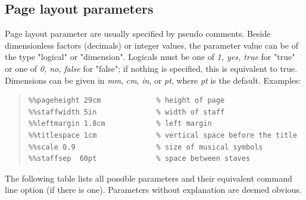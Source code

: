 \documentclass[a4paper]{article}
\begin{document}
\subsection{Page layout parameters}
\label{sec:LayoutParams}
Page layout parameter are usually specified by pseudo comments.
Beside dimensionless factors (decimals) or integer values, the parameter 
value can be of the type "logical" or "dimension". Logicals
must be one of {\it 1, yes, true} for "true" or one of {\it 0, no,
false} for "false"; if nothing is specified, this is equivalent to true.
Dimensions can be given in {\it mm}, {\it cm}, {\it in}, or {\it pt}, 
where {\it pt} is the default.
Examples:
\begin{quote}
\begin{verbatim}
%%pageheight 29cm             % height of page
%%staffwidth 5in              % width of staff
%%leftmargin 1.8cm            % left margin
%%titlespace 1cm              % vertical space before the title
%%scale 0.9                   % size of musical symbols
%%staffsep  60pt              % space between staves
\end{verbatim}
\end{quote}
The following table lists all possible parameters and their
equivalent command line option (if there is one). Parameters
without explanation are deemed obvious.
\end{document}
